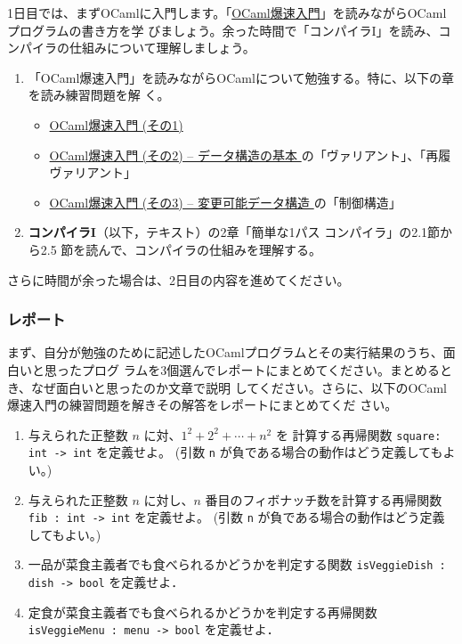 \documentclass[a4paper,11pt]{jsarticle}
\begin{document}
1日目では、まずOCamlに入門します。「\href{https://www.fos.kuis.kyoto-u.ac.jp}{OCaml爆速入門}」を読みながらOCamlプログラムの書き方を学
びましょう。余った時間で「コンパイラI」を読み、コンパイラの仕組みについて理解しましょう。

\begin{enumerate}
\item 「OCaml爆速入門」を読みながらOCamlについて勉強する。特に、以下の章を読み練習問題を解
  く。
  \begin{itemize}
  \item
    \href{https://www.fos.kuis.kyoto-u.ac.jp/~igarashi/class/pl/03-ocaml.html#quick-intro-ocaml}{
      OCaml爆速入門 (その1)}
  \item
    \href{https://www.fos.kuis.kyoto-u.ac.jp/~igarashi/class/pl/03-ocaml.html#quick-intro-ocaml2}{
      OCaml爆速入門 (その2) -- データ構造の基本
    } の「ヴァリアント」、「再履ヴァリアント」
  \item
    \href{https://www.fos.kuis.kyoto-u.ac.jp/~igarashi/class/pl/03-ocaml.html#quick-intro-ocaml2}{
      OCaml爆速入門 (その3) -- 変更可能データ構造
    } の「制御構造」
  \end{itemize}
\item \textbf{コンパイラI}（以下，テキスト）の2章「簡単な1パス コンパイラ」の2.1節から2.5
  節を読んで、コンパイラの仕組みを理解する。
\end{enumerate}

さらに時間が余った場合は、2日目の内容を進めてください。

\subsubsection{レポート}

まず、自分が勉強のために記述したOCamlプログラムとその実行結果のうち、面白いと思ったプログ
ラムを3個選んでレポートにまとめてください。まとめるとき、なぜ面白いと思ったのか文章で説明
してください。さらに、以下のOCaml爆速入門の練習問題を解きその解答をレポートにまとめてくだ
さい。

\begin{enumerate}
\item 与えられた正整数 $n$ に対、$1^2 + 2^2 + \cdots + n^2$ を
  計算する再帰関数 \verb|square: int -> int| を定義せよ。
  (引数 \verb|n| が負である場合の動作はどう定義してもよい。)
\item 与えられた正整数 $n$ に対し、$n$ 番目のフィボナッチ数を計算する再帰関数 \verb|fib : int -> int| を定義せよ。
  (引数 \verb|n| が負である場合の動作はどう定義してもよい。)
\item 一品が菜食主義者でも食べられるかどうかを判定する関数 \verb|isVeggieDish : dish -> bool| を定義せよ．
\item 定食が菜食主義者でも食べられるかどうかを判定する再帰関数 \verb|isVeggieMenu : menu -> bool| を定義せよ．
\end{enumerate}
\end{document}
